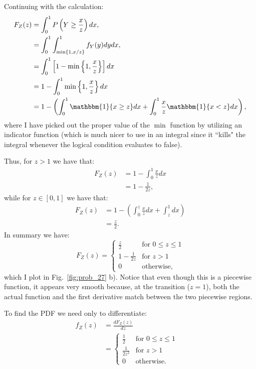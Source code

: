 \begin{problem}{27}
Continuing with the calculation:
\begin{align*}
F_Z(z) &=  \int_{0}^1 P\left(Y \ge \frac{x}{z}\right)dx,\\
& = \int_{0}^1 \int_{\min \{1, x/z \}}^1 f_Y(y)dy dx,\\
& = \int_0^1 \left [1- \min \left \{ 1, \frac{x}{z}\right \} \right]dx \\
& =1 - \int_0^1  \min \left \{ 1, \frac{x}{z}\right \} dx \\
& =1 - \left (\int_0^1 \mathbbm{1} \{x \ge z \}dx+\int_0^1\frac{x}{z} \mathbbm{1} \{x < z \}dx  \right),
\end{align*}
where I have picked out the proper value of the $\min$ function by utilizing an indicator function (which is much nicer to use in an integral since it ``kills" the integral whenever the logical condition evaluates to false).

Thus, for $z>1$ we have that:
\begin{align*}
F_Z(z) &=1 - \int_0^1 \frac{x}{z}dx \\
& =1-\frac{1}{2z},
\end{align*}
while for $z\in [0,1]$ we have that:
\begin{align*}
F_Z(z) &=1 - \left( \int_0^z \frac{x}{z}dx+\int_z^1 dx \right) \\
& =\frac{z}{2}.
\end{align*}
In summary we have:
\[
 F_Z(z) =
  \begin{cases}
                                  \frac{z}{2}& \text{for $0 \le z \le 1$} \\
                                   1 - \frac{1}{2z} & \text {for $z >1$} \\
                                   0& \text {otherwise},
   \end{cases}
\]
which I plot in Fig.~\ref{fig:prob_27} b).  Notice that even though this is a piecewise function, it appears very smooth because, at the transition ($z =1$), both the actual function and the first derivative match between the two piecewise regions.

To find the PDF we need only to differentiate:
\begin{align*}  
f_Z(z) &= \frac{dF_Z(z)}{dz} \\
& = \begin{cases}
                                  \frac{1}{2} &  \text{for $0 \le z \le 1$}\\
                                 \frac{1}{2z^2} &\text {for $z >1$} \\
                                 0& \text {otherwise}.
    \end{cases} \quad
\end{align*}


\end{problem}


